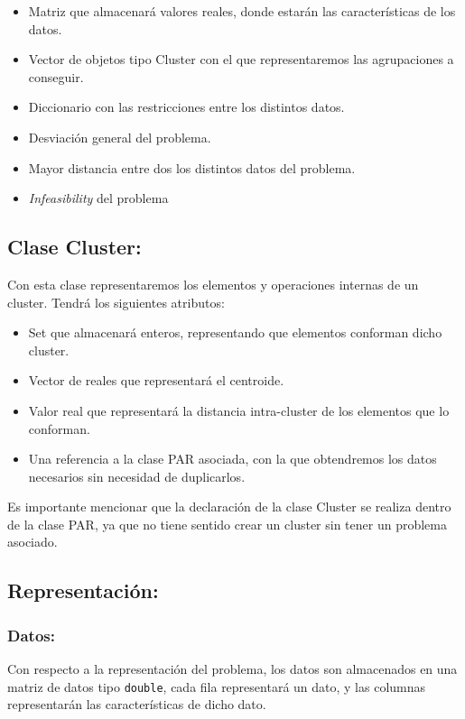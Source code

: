 \documentclass[12pt, spanish]{article}
\begin{document}
\begin{itemize}
	\item {Matriz que almacenará valores reales, donde estarán las características de los datos.}
	\item {Vector de objetos tipo Cluster con el que representaremos las agrupaciones a conseguir.}
	\item {Diccionario con las restricciones entre los distintos datos.}
	\item {Desviación general del problema.}
	\item {Mayor distancia entre dos los distintos datos del problema.}
	\item {\textit{Infeasibility} del problema}
\end{itemize}


\subsection{Clase Cluster:}

Con esta clase representaremos los elementos y operaciones internas de un cluster. Tendrá los siguientes atributos:

\begin{itemize}
	\item {Set que almacenará enteros, representando que elementos conforman dicho cluster.}
	\item {Vector de reales que representará el centroide.}
	\item {Valor real que representará la distancia intra-cluster de los elementos que lo conforman.}
	\item {Una referencia a la clase PAR asociada, con la que obtendremos los datos necesarios sin necesidad de duplicarlos.}
\end{itemize}

Es importante mencionar que la declaración de la clase Cluster se realiza dentro de la clase PAR, ya que no tiene sentido crear un cluster sin tener un problema asociado.


\newpage

\subsection{Representación:}

\subsubsection{Datos:}

Con respecto a la representación del problema, los datos son almacenados en una matriz de datos tipo \texttt{double}, cada fila representará un dato, y las columnas representarán las características de dicho dato.
\end{document}
